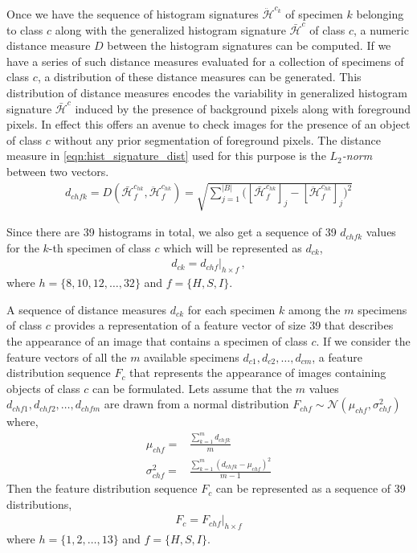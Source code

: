 \documentclass {udthesis}
\begin{document}
Once we have the sequence of histogram signatures $\ddot{\mathcal{H}}^{c_{k}}$ of specimen $k$ belonging to class $c$ along with the generalized histogram signature $\bar{\mathcal{H}}^{c}$ of class $c$, a numeric distance measure $D$ between the histogram signatures can be computed. If we have a series of such distance measures evaluated for a collection of specimens of class $c$, a distribution of these distance measures can be generated. This distribution 
of distance measures encodes the variability in generalized histogram signature $\bar{\mathcal{H}}^{c}$ induced by the presence of background pixels along with foreground pixels. In effect this offers an avenue to check images for the presence of an object of class $c$ without any prior segmentation of foreground pixels. The distance measure in  \eqref{eqn:hist_signature_dist} used for this purpose is the \emph{$L_2$-norm} between two vectors.
%
\begin{align}	\label{eqn:hist_signature_dist}
 d_{chfk} = D(\bar{\mathcal{H}}^{c_{hk}}_f, \ddot{\mathcal{H}}^{c_{hk}}_f) 
 = \sqrt{\sum_{j=1}^{|B|}\Bigg(\left[\bar{\mathcal{H}}^{c_{hk}}_f\right]_j
 -\left[\ddot{\mathcal{H}}^{c_{hk}}_f\right]_j\Bigg)^2}
\end{align}

Since there are 39 histograms in total, we also get a sequence of 39 $d_{chfk}$ values for the $k$-th specimen of class $c$ which will be represented as $d_{ck}$,
%
\begin{align}	\label{eqn:dist_sequence}
 d_{ck}=d_{chf}\Big|_{h\times f}\,,
\end{align}
%
where $h=\{8,10,12, \ldots,32\}$ and $f=\{H,S,I\}$.

A sequence of distance measures $d_{ck}$ for each specimen $k$ among the $m$ specimens of class $c$ provides a representation of a feature vector of size 39 that describes the appearance of an image that contains a specimen of class $c$. If we consider the feature vectors of all the $m$ available specimens $d_{c1},d_{c2},\ldots,d_{cm}$, a feature distribution sequence $F_c$ that represents the appearance of images containing objects of class $c$ can be formulated. Lets assume that the $m$ values $d_{chf1}, d_{chf2},\ldots,d_{chfm}$ are drawn from a normal distribution $F_{chf}\sim\mathcal{N}(\mu_{chf},\sigma^2_{chf})$ where,
%
\begin{align}
 \mu_{chf}= &\frac{\sum_{k=1}^m d_{chfk}}{m}\\
 \sigma^2_{chf}= &\frac{\sum_{k=1}^m (d_{chfk}-\mu_{chf})^2}{m-1}
\end{align}
%
Then the feature distribution sequence $F_c$ can be represented as a sequence of 39 distributions,
\begin{align}
 F_c=F_{chf}\Big|_{h \times f}
\end{align}
where $h=\{1,2,\ldots,13\}$ and $f=\{H,S,I\}$. 
\end{document}
